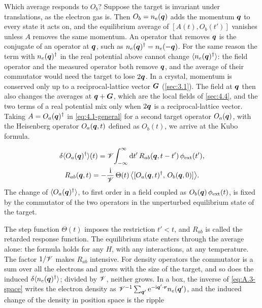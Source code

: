 Which average responds to $O_b$? Suppose the target is invariant under translations, as the electron gas is. Then $O_b = n_e(\bm{q})$ adds the momentum $\bm{q}$ to every state it acts on, and the equilibrium average of $[A(t), O_b(t')]$ vanishes unless $A$ removes the same momentum. An operator that removes $\bm{q}$ is the conjugate of an operator at $\bm{q}$, such as $n_e(\bm{q})^\dagger = n_e(-\bm{q})$. For the same reason the term with $n_e(\bm{q})^\dagger$ in the real potential above cannot change $\langle n_e(\bm{q})^\dagger\rangle$: the field operator and the measured operator both remove $\bm{q}$, and the average of their commutator would need the target to lose $2\bm{q}$. In a crystal, momentum is conserved only up to a reciprocal-lattice vector $\bm{G}$ (\cref{sec:3.1}). The field at $\bm{q}$ then also changes the averages at $\bm{q} + \bm{G}$, which are the local fields of \cref{sec:4.4}, and the two terms of a real potential mix only when $2\bm{q}$ is a reciprocal-lattice vector. Taking $A = O_a(\bm{q})^\dagger$ in \cref{eq:4.1-general} for a second target operator $O_a(\bm{q})$, with the Heisenberg operator $O_a(\bm{q},t)$ defined as $O_b(t)$, we arrive at the Kubo formula.
\begin{keyresult}
\begin{equation}
  \begin{gathered}
  \delta\langle O_a(\bm{q})^\dagger\rangle(t) = \mathscr{V}\!\int_{-\infty}^{\infty}\mathrm{d} t'\,R_{ab}(\bm{q}, t - t')\,\phi_{\mathrm{ext}}(t'), \\
  R_{ab}(\bm{q}, t) = -\frac{\mathrm{i}}{\mathscr{V}}\,\Theta(t)\,\bigl\langle[O_a(\bm{q},t)^\dagger,\,O_b(\bm{q},0)]\bigr\rangle .
  \end{gathered}
  \label{eq:4.1-kubo}
\end{equation}
The change of $\langle O_a(\bm{q})^\dagger\rangle$, to first order in a field coupled as $O_b(\bm{q})\,\phi_{\mathrm{ext}}(t)$, is fixed by the commutator of the two operators in the unperturbed equilibrium state of the target.
\end{keyresult}
The step function $\Theta(t)$ imposes the restriction $t' < t$, and $R_{ab}$ is called the retarded response function. The equilibrium state enters through the average alone: the formula holds for any $H$, with any interactions, at any temperature. The factor $1/\mathscr{V}$ makes $R_{ab}$ intensive. For density operators the commutator is a sum over all the electrons and grows with the size of the target, and so does the induced $\delta\langle n_e(\bm{q})^\dagger\rangle$; divided by $\mathscr{V}$, neither grows. In a box, the inverse of \cref{eq:A.3-space} writes the electron density as $\mathscr{V}^{-1}\sum_{\bm{q}'}\mathrm{e}^{-\mathrm{i}\bm{q}'\cdot\bm{r}}n_e(\bm{q}')$, and the induced change of the density in position space is the ripple
